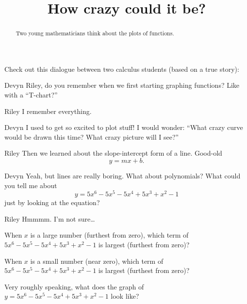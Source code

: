 \documentclass{ximera}
\title[Break-Ground:]{How crazy could it be?}
\begin{document}
\begin{abstract}
  Two young mathematicians think about the plots of functions.
\end{abstract}
\maketitle

Check out this dialogue between two calculus students (based on a true
story):

\begin{dialogue}
\item[Devyn] Riley, do you remember when we first starting graphing
  functions? Like with a ``T-chart?''
\item[Riley] I remember everything.
\item[Devyn] I used to get so excited to plot stuff! I would wonder:
  ``What crazy curve would be drawn this time? What crazy picture will
  I see?''
\item[Riley] Then we learned about the slope-intercept form of a
  line. Good-old
  \[
  y = mx +b.
  \]
\item[Devyn] Yeah, but lines are really boring. What about
  polynomials? What could you tell me about
  \[
  y= 5x^6-5x^5-5x^4+5x^3+x^2 -1
  \]
  just by looking at the equation?
\item[Riley] Hmmmm. I'm not sure\dots
\end{dialogue}

\begin{problem}
  When $x$ is a large number (furthest from zero), which term of
  $5x^6-5x^5-5x^4+5x^3+x^2 -1$ is largest (furthest from zero)?
  \begin{multipleChoice}
  \end{multipleChoice}
\end{problem}

\begin{problem}
  When $x$ is a small number (near zero), which term of
  $5x^6-5x^5-5x^4+5x^3+x^2 -1$ is largest (furthest from zero)?
  \begin{multipleChoice}
  \end{multipleChoice}
\end{problem}


\begin{problem}
  Very roughly speaking, what does the graph of
  $y=5x^6-5x^5-5x^4+5x^3+x^2 -1$ look like?
  \begin{multipleChoice}
  \end{multipleChoice}
\end{problem}



%
\end{document}
